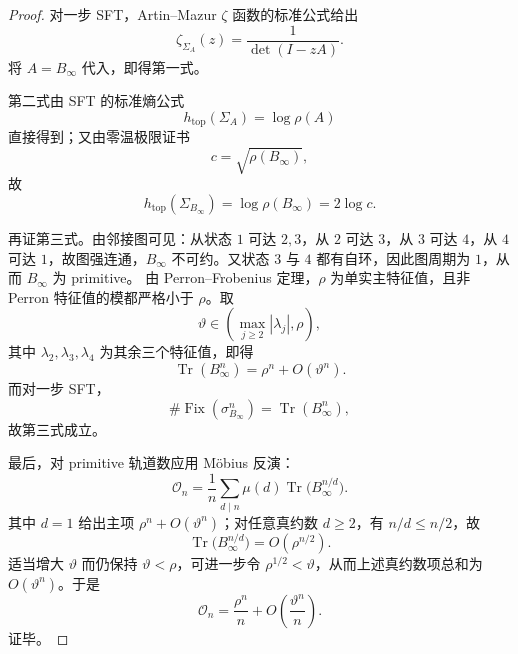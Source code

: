 \begin{proof}
对一步 SFT，Artin--Mazur \(\zeta\) 函数的标准公式给出
\[
\zeta_{\Sigma_A}(z)=\frac{1}{\det(I-zA)}.
\]
将 \(A=B_\infty\) 代入，即得第一式。

第二式由 SFT 的标准熵公式
\[
h_{\mathrm{top}}(\Sigma_A)=\log \rho(A)
\]
直接得到；又由零温极限证书
\[
c=\sqrt{\rho(B_\infty)},
\]
故
\[
h_{\mathrm{top}}(\Sigma_{B_\infty})=\log\rho(B_\infty)=2\log c.
\]

再证第三式。由邻接图可见：从状态 \(1\) 可达 \(2,3\)，从 \(2\) 可达 \(3\)，从 \(3\) 可达 \(4\)，从 \(4\) 可达 \(1\)，故图强连通，\(B_\infty\) 不可约。又状态 \(3\) 与 \(4\) 都有自环，因此图周期为 \(1\)，从而 \(B_\infty\) 为 primitive。
由 Perron--Frobenius 定理，\(\rho\) 为单实主特征值，且非 Perron 特征值的模都严格小于 \(\rho\)。取
\[
\vartheta\in
\left(
\max_{j\ge 2}|\lambda_j|,
\rho
\right),
\]
其中 \(\lambda_2,\lambda_3,\lambda_4\) 为其余三个特征值，即得
\[
\operatorname{Tr}(B_\infty^n)=\rho^n+O(\vartheta^n).
\]
而对一步 SFT，
\[
\#\operatorname{Fix}(\sigma_{B_\infty}^n)=\operatorname{Tr}(B_\infty^n),
\]
故第三式成立。

最后，对 primitive 轨道数应用 Möbius 反演：
\[
\mathcal O_n
=
\frac1n\sum_{d\mid n}\mu(d)\operatorname{Tr}\!\bigl(B_\infty^{n/d}\bigr).
\]
其中 \(d=1\) 给出主项 \(\rho^n+O(\vartheta^n)\)；对任意真约数 \(d\ge 2\)，有 \(n/d\le n/2\)，故
\[
\operatorname{Tr}\!\bigl(B_\infty^{n/d}\bigr)=O(\rho^{n/2}).
\]
适当增大 \(\vartheta\) 而仍保持 \(\vartheta<\rho\)，可进一步令 \(\rho^{1/2}<\vartheta\)，从而上述真约数项总和为 \(O(\vartheta^n)\)。于是
\[
\mathcal O_n=\frac{\rho^n}{n}+O\!\left(\frac{\vartheta^n}{n}\right).
\]
证毕。
\end{proof}

